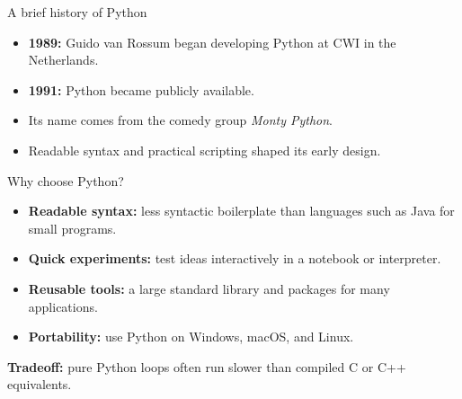 \documentclass[aspectratio=169,12pt]{beamer}
\begin{document}
\begin{frame}[fragile]{A brief history of Python}
\begin{itemize}
\item \textbf{1989:} Guido van Rossum began developing Python at CWI in the Netherlands.
\item \textbf{1991:} Python became publicly available.
\item Its name comes from the comedy group \textit{Monty Python}.
\item Readable syntax and practical scripting shaped its early design.
\end{itemize}
\end{frame}
\begin{frame}[fragile]{Why choose Python?}
\begin{itemize}
\item \textbf{Readable syntax:} less syntactic boilerplate than languages such as Java for small programs.
\item \textbf{Quick experiments:} test ideas interactively in a notebook or interpreter.
\item \textbf{Reusable tools:} a large standard library and packages for many applications.
\item \textbf{Portability:} use Python on Windows, macOS, and Linux.
\end{itemize}
\medskip
\textbf{Tradeoff:} pure Python loops often run slower than compiled C or C++ equivalents.
\end{frame}
\end{document}
